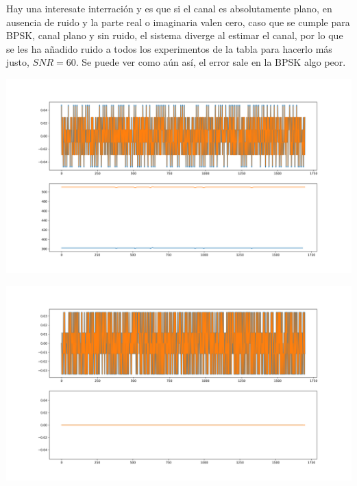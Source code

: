 \documentclass[11pt]{scrartcl} %
\begin{document}
\begin{preview}
Hay una interesate interración y es que si el canal es absolutamente plano, en ausencia de ruido y la parte real o imaginaria valen cero, caso que se cumple para BPSK, canal plano y sin ruido, el sistema diverge al estimar el canal, por lo que se les ha añadido ruido a todos los experimentos de la tabla para hacerlo más justo, $SNR = 60$. Se puede ver como aún así, el error sale en la BPSK algo peor.

\begin{minipage}{\linewidth}
	\begin{center}
		\includegraphics[width=1\columnwidth,trim={0 0.5cm 1cm 1cm},clip]{../../Linux/Trabajo/FullSystemCCTb/imgs/vsOctave2flatre.png} %
	\end{center}
	\label{eqmatlabflatre}
\end{minipage}	

\begin{minipage}{\linewidth}
	\begin{center}
		\includegraphics[width=1\columnwidth,trim={0 0.5cm 1cm 1cm},clip]{../../Linux/Trabajo/FullSystemCCTb/imgs/vsOctave2flatim.png} %
	\end{center}
	\label{eqmatlabflatim}
\end{minipage}	


\end{preview}
\end{document}
